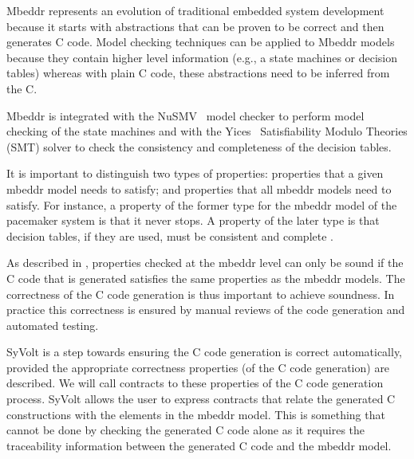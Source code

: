Mbeddr represents an evolution of traditional embedded system development because it starts with abstractions that can be proven to be correct and then generates C code. Model checking techniques can be applied to Mbeddr models because they contain higher level information (e.g., a state machines or decision tables) whereas with plain C code, these abstractions need to be inferred from the C.

Mbeddr is integrated with the NuSMV~\cite{Cimatti2002} model checker to perform model checking of the state machines and with the Yices~\cite{Dutertre:cav2014} Satisfiability Modulo Theories (SMT) solver to check the consistency and completeness of the decision tables.

It is important to distinguish two types of properties: properties that a given mbeddr model needs to satisfy; and properties that all mbeddr models need to satisfy.
For instance, a property of the former type for the mbeddr model of the pacemaker system is that it never stops. A property of the later type is that decision tables, if they are used, must be consistent and complete \cite{Ratiu:2012:LEE:2663689.2663692}.

As described in \cite{Ratiu:2012:LEE:2663689.2663692}, properties checked at the mbeddr level can only be sound if the C code that is generated satisfies the same properties as the mbeddr models.
The correctness of the C code generation is thus important to achieve soundness.
In practice this correctness is ensured by manual reviews of the code generation and automated testing.

SyVolt is a step towards ensuring the C code generation is correct automatically, provided the appropriate correctness properties (of the C code generation) are described. We will call contracts to these properties of the C code generation process.
SyVolt allows the user to express contracts that relate the generated C constructions with the elements in the mbeddr model.
This is something that cannot be done by checking the generated C code alone as it requires the traceability information between the generated C code and the mbeddr model.

